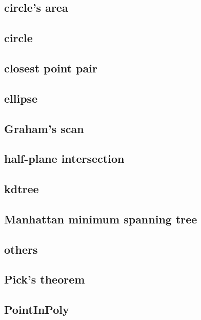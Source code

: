 \documentclass[a4paper,5pt,titlepage]{article}
\begin{document}
\subsection{circle's area}

\subsection{circle}

\subsection{closest point pair}

\subsection{ellipse}

\subsection{Graham's scan}

\subsection{half-plane intersection}

\subsection{kdtree}

\subsection{Manhattan minimum spanning tree}

\subsection{others}

\subsection{Pick's theorem}

\subsection{PointInPoly}

\end{document}
